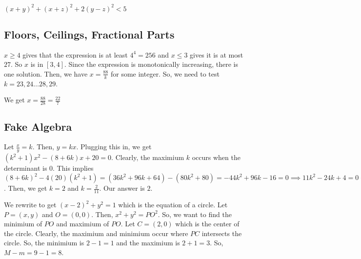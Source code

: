 \documentclass[11pt]{article}
\begin{document}



\begin{sol}
 $(x+y)^2+(x+z)^2+2(y-z)^2<5$
\end{sol}

\subsection{Floors, Ceilings, Fractional Parts}

\begin{sol}
$x\ge 4$ gives that the expression is at least $4^4=256$ and $x\leq 3$ gives it is at most $27$.
So $x$ is in $[3,4]$. Since the expression is monotonically increasing, there is one solution.
Then, we have $x=\frac{88}{k}$ for some integer. So, we need to test $k=23,24\ldots 28,29$.

We get $x=\boxed{\frac{88}{28}=\frac{22}{7}}$
\end{sol}

\subsection{Fake Algebra}

\begin{sol}
Let $\frac{x}{y}=k$. Then, $y=kx$. Plugging this in, we get $(k^2+1)x^2-(8+6k)x+20=0$. Clearly, the maximium $k$ occurs when the determinant is $0$. This implies $(8+6k)^2-4(20)(k^2+1)=(36k^2+96k+64)-(80k^2+80)=-44k^2+96k-16=0\implies 11k^2-24k+4=0\implies (11k-2)(k-2)=0$. Then, we get $k=2$ and $k=\frac{2}{11}$. Our answer is $\boxed{2}$.
\end{sol}

\begin{sol}
We rewrite to get $(x-2)^2+y^2=1$ which is the equation of a circle. Let $P=(x,y)$ and $O=(0,0)$. Then, $x^2+y^2=PO^2$. So, we want to find the minimium of $PO$ and maximium of $PO$. Let $C=(2,0)$ which is the center of the circle. Clearly, the maximium and minimium occur where $PC$ intersects the circle. So, the minimium is $2-1=1$ and the maximium is $2+1=3$. So, $M-m=9-1=\boxed{8}$.
\end{sol}
\end{document}
